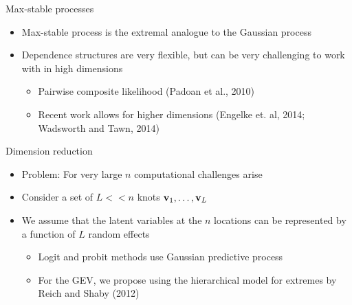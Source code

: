 \documentclass{beamer}
\begin{document}
\begin{frame}{Max-stable processes}
\begin{itemize} \setlength{\itemsep}{1em}
  \item Max-stable process is the extremal analogue to the Gaussian process
  \item Dependence structures are very flexible, but can be very challenging to work with in high dimensions
  \begin{itemize} \setlength{\itemsep}{0.5em}
    \item Pairwise composite likelihood (Padoan et al., 2010)
    \item Recent work allows for higher dimensions (Engelke et. al, 2014; Wadsworth and Tawn, 2014)
  \end{itemize}
\end{itemize}
\end{frame}

\begin{frame}{Dimension reduction}
\begin{itemize} \setlength{\itemsep}{1em}
  \item \alert{Problem}: For very large $n$ computational challenges arise
  \item Consider a set of $L << n$ knots $\mbox{\bf v}_1, \ldots, \mbox{\bf v}_L$
  \item We assume that the latent variables at the $n$ locations can be represented by a function of $L$ random effects
  \begin{itemize} \setlength{\itemsep}{0.5em}
    \item Logit and probit methods use Gaussian predictive process
    \item For the GEV, we propose using the hierarchical model for extremes by Reich and Shaby (2012)
  \end{itemize}
\end{itemize}
\end{frame}
\end{document}
